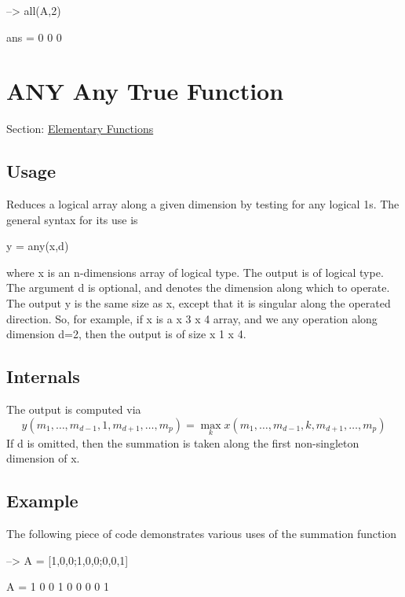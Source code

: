 \begin{DoxyVerbInclude}
--> all(A,2)

ans = 
 0 
 0 
 0 
\end{DoxyVerbInclude}
 \hypertarget{elementary_any}{}\section{A\-N\-Y Any True Function}\label{elementary_any}
Section\-: \hyperlink{sec_elementary}{Elementary Functions} \hypertarget{vtkwidgets_vtkxyplotwidget_Usage}{}\subsection{Usage}\label{vtkwidgets_vtkxyplotwidget_Usage}
Reduces a logical array along a given dimension by testing for any logical 1s. The general syntax for its use is \begin{DoxyVerb}  y = any(x,d)
\end{DoxyVerb}
 where {\ttfamily x} is an {\ttfamily n}-\/dimensions array of {\ttfamily logical} type. The output is of {\ttfamily logical} type. The argument {\ttfamily d} is optional, and denotes the dimension along which to operate. The output {\ttfamily y} is the same size as {\ttfamily x}, except that it is singular along the operated direction. So, for example, if {\ttfamily x} is a { x 3 x 4} array, and we {\ttfamily any} operation along dimension {\ttfamily d=2}, then the output is of size { x 1 x 4}. \hypertarget{transforms_svd_Function}{}\subsection{Internals}\label{transforms_svd_Function}
The output is computed via \[ y(m_1,\ldots,m_{d-1},1,m_{d+1},\ldots,m_{p}) = \max_{k} x(m_1,\ldots,m_{d-1},k,m_{d+1},\ldots,m_{p}) \] If {\ttfamily d} is omitted, then the summation is taken along the first non-\/singleton dimension of {\ttfamily x}. \hypertarget{variables_struct_Example}{}\subsection{Example}\label{variables_struct_Example}
The following piece of code demonstrates various uses of the summation function


\begin{DoxyVerbInclude}
--> A = [1,0,0;1,0,0;0,0,1]

A = 
 1 0 0 
 1 0 0 
 0 0 1 
\end{DoxyVerbInclude}



